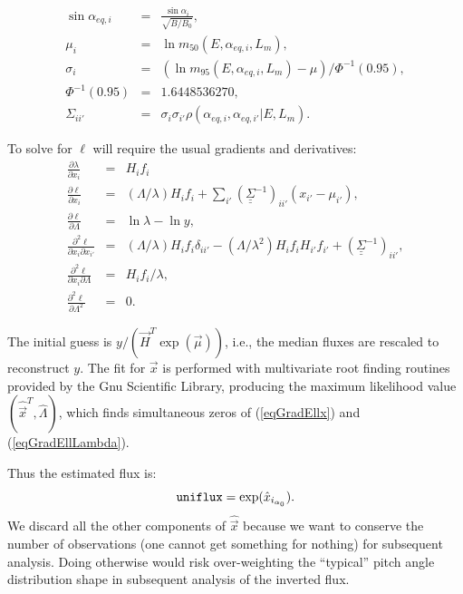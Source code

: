 \documentclass{article}    %
\newcommand{\dbul}[1]{\underline{\underline{#1}}}
\begin{document}
\begin{eqnarray}
\sin\alpha_{eq,i} &=& \frac{\sin\alpha_i}{\sqrt{B/B_0}}, \\
\mu_i &=& \ln m_{50}(E,\alpha_{eq,i},L_m), \\
\sigma_i &=& (\ln m_{95}(E,\alpha_{eq,i},L_m)-\mu)/\Phi^{-1}(0.95), \\
\Phi^{-1}(0.95) &=& 1.6448536270, \\
\Sigma_{ii'} &=& \sigma_i \sigma_{i'} \rho(\alpha_{eq,i},\alpha_{eq,i'}|E,L_m).
\end{eqnarray}

To solve for $\ell$ will require the usual gradients and derivatives:
\begin{eqnarray}
\frac{\partial \lambda}{\partial x_i} &=& H_i f_i\\
\frac{\partial \ell}{\partial x_i} &=&
(\Lambda/\lambda) H_i f_i + \sum_{i'}\left(\dbul{\Sigma}^{-1}\right)_{ii'}(x_{i'}-\mu_{i'}) , \label{eqGradEllx} \\
\frac{\partial \ell}{\partial \Lambda} &=& \ln\lambda-\ln y, \label{eqGradEllLambda} \\
\frac{\partial^2 \ell}{\partial x_i \partial x_{i'}} &=&
(\Lambda/\lambda) H_i f_i \delta_{ii'} 
-(\Lambda/\lambda^2) H_i f_i H_{i'} f_{i'} +
\left(\dbul{\Sigma}^{-1}\right)_{ii'}, \\
\frac{\partial^2 \ell}{\partial x_i \partial \Lambda} &=&
H_i f_i/\lambda, \\
\frac{\partial^2 \ell}{\partial \Lambda^2} &=& 0.
\end{eqnarray}

The initial guess is $y/(\vec{H}^T\exp(\vec{\mu}))$, i.e., the median
fluxes are rescaled to reconstruct $y$.  The fit for $\vec{x}$ is
performed with multivariate root finding routines provided by the Gnu
Scientific Library, producing the maximum likelihood value
$(\hat{\vec{x}}^T,\hat{\Lambda})$, which finds simultaneous zeros of (\ref{eqGradEllx})
and (\ref{eqGradEllLambda}).

Thus the estimated flux is:
\begin{equation}
\verb|uniflux| = \exp(\hat{x}_{i_{\alpha_0}}).
\end{equation}
We discard all the other components of $\hat{\vec{x}}$ because we want
to conserve the number of observations (one cannot get something for
nothing) for subsequent analysis. Doing otherwise would risk
over-weighting the ``typical'' pitch angle distribution shape in
subsequent analysis of the inverted flux.
\end{document}
